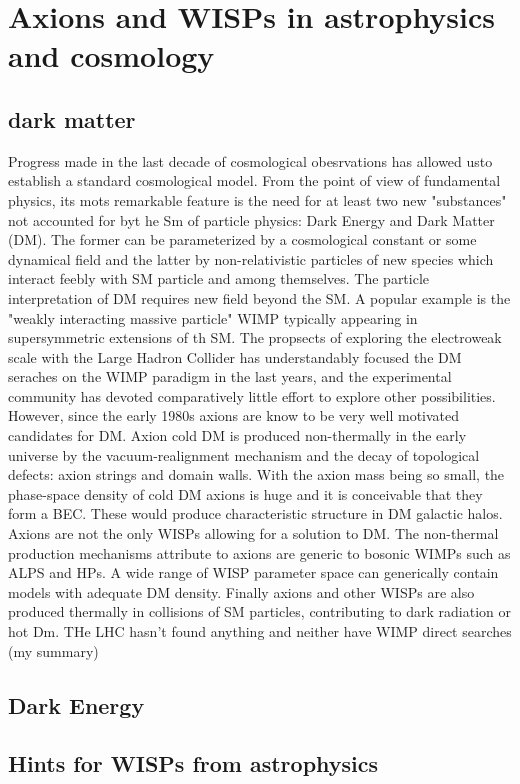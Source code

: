 \documentclass[12pt, twoside]{book}
\begin{document}
\section{Axions and WISPs in astrophysics and cosmology}
\subsection{dark matter}
Progress made in the last decade of cosmological obesrvations has allowed usto establish a standard cosmological model. From the point of view of fundamental physics, its mots remarkable feature is the need for at least two new "substances" not accounted for byt he Sm of particle physics: Dark Energy and Dark Matter (DM). The former can be parameterized by a cosmological constant or some dynamical field and the latter by non-relativistic particles of new species which interact feebly with SM particle and among themselves.
The particle interpretation of DM requires new field beyond the SM. A popular example is the "weakly interacting massive particle" WIMP typically appearing in supersymmetric extensions of th SM. The propsects of exploring the electroweak scale with the Large Hadron Collider has understandably focused the DM seraches on the WIMP paradigm in the last years, and the experimental community has devoted comparatively little effort to explore other possibilities.
However, since the early 1980s axions are know to be very well motivated candidates for DM. Axion cold DM is produced non-thermally in the early universe by the vacuum-realignment mechanism and the decay of topological defects: axion strings and  domain walls. With the axion mass being so small, the phase-space density of cold DM axions is huge and it is conceivable that they form a BEC. These would produce characteristic structure in DM galactic halos.
Axions are not the only WISPs allowing for a solution to DM. The non-thermal production mechanisms attribute to axions are generic to bosonic WIMPs such as ALPS and HPs. A wide range of WISP parameter space can generically contain models with adequate DM density. Finally axions and other WISPs are also produced thermally in collisions of SM particles, contributing to dark radiation or hot Dm.
THe LHC hasn't found anything and neither have WIMP direct searches (my summary)

\subsection{Dark Energy}
\subsection{Hints for WISPs from astrophysics}
\end{document}
